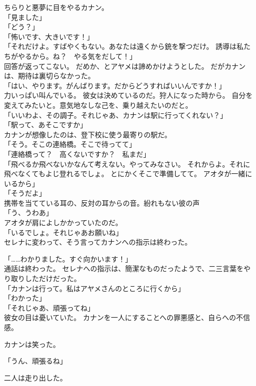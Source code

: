 \documentclass[../IHMain]{subfiles}
\begin{document}
ちらりと悪夢に目をやるカナン。\\
「見ました」\\
「どう？」\\
「怖いです、大きいです！」\\
「それだけよ。すばやくもない。あなたは遠くから銃を撃つだけ。
誘導は私たちがやるから。ね？　やる気をだして！」\\
回答が返ってこない。
だめか、とアヤメは諦めかけようとした。
だがカナンは、期待は裏切らなかった。\\
「はい、やります。がんばります。だからどうすればいいんですか！」\\
力いっぱい叫んでいる。
彼女は決めているのだ。狩人になった時から。
自分を変えてみたいと。意気地なしな己を、乗り越えたいのだと。\\
「いいわよ、その調子。それじゃあ、カナンは駅に行ってくれない？」\\
「駅って、あそこですか」\\
カナンが想像したのは、登下校に使う最寄りの駅だ。\\
「そう。そこの連絡橋。そこで待ってて」\\
「連絡橋って？　高くないですか？　私まだ」\\
「飛べるか飛べないかなんて考えない。やってみなさい。
それからよ。それに飛べなくてもよじ登れるでしょ。
とにかくそこで準備してて。
アオタが一緒にいるから」\\
「そうだよ」\\
携帯を当てている耳の、反対の耳からの音。紛れもない彼の声\\
「う、うわあ」\\
アオタが肩によしかかっていたのだ。\\
「いるでしょ。それじゃあお願いね」\\
セレナに変わって、そう言ってカナンへの指示は終わった。

「……わかりました。すぐ向かいます！」\\
通話は終わった。
セレナへの指示は、簡潔なものだったようで、二三言葉をやり取りしただけだった。\\
「カナンは行って。私はアヤメさんのところに行くから」\\
「わかった」\\
「それじゃあ、頑張ってね」\\
彼女の目は憂いていた。
カナンを一人にすることへの罪悪感と、自らへの不信感。

カナンは笑った。

「うん、頑張るね」

二人は走り出した。
\end{document}
